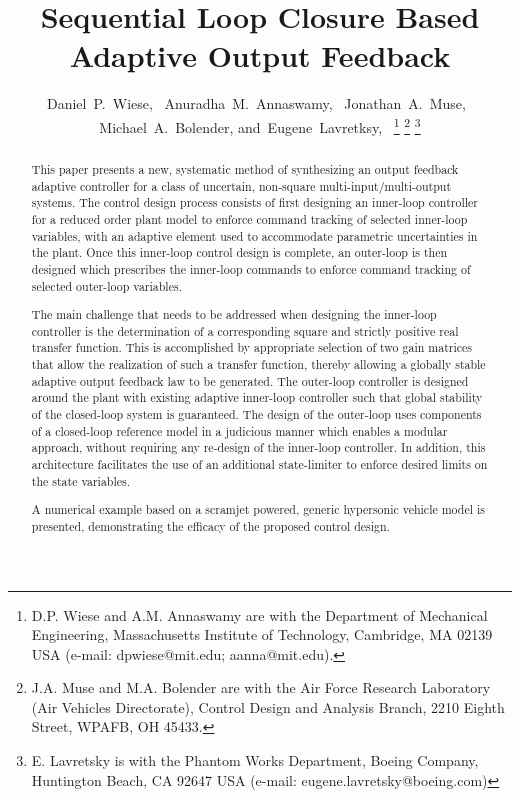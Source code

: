\documentclass[journal]{IEEEtran}
\theoremstyle{innercustomthm}
\begin{document}
  \title{Sequential Loop Closure Based Adaptive Output Feedback}

  \author{Daniel~P.~Wiese,~
          Anuradha~M.~Annaswamy,~
          Jonathan~A.~Muse,~
          Michael~A.~Bolender,
          and~Eugene~Lavretksy,~%
  \thanks{D.P. Wiese and A.M. Annaswamy are with the Department of Mechanical Engineering, Massachusetts Institute of Technology, Cambridge, MA 02139 USA (e-mail: dpwiese@mit.edu; aanna@mit.edu).}%
  \thanks{J.A. Muse and M.A. Bolender are with the Air Force Research Laboratory (Air Vehicles Directorate), Control Design and Analysis Branch, 2210 Eighth Street, WPAFB, OH 45433.}%
  \thanks{E. Lavretsky is with the Phantom Works Department, Boeing Company, Huntington Beach, CA 92647 USA (e-mail: eugene.lavretsky@boeing.com)}}

  \maketitle

  \begin{abstract}
    This paper presents a new, systematic method of synthesizing an output feedback adaptive controller for a class of uncertain, non-square multi-input/multi-output systems.
    The control design process consists of first designing an inner-loop controller for a reduced order plant model to enforce command tracking of selected inner-loop variables, with an adaptive element used to accommodate parametric uncertainties in the plant.
    Once this inner-loop control design is complete, an outer-loop is then designed which prescribes the inner-loop commands to enforce command tracking of selected outer-loop variables.

    The main challenge that needs to be addressed when designing the inner-loop controller is the determination of a corresponding square and strictly positive real transfer function.
    This is accomplished by appropriate selection of two gain matrices that allow the realization of such a transfer function, thereby allowing a globally stable adaptive output feedback law to be generated.
    The outer-loop controller is designed around the plant with existing adaptive inner-loop controller such that global stability of the closed-loop system is guaranteed.
    The design of the outer-loop uses components of a closed-loop reference model in a judicious manner which enables a modular approach, without requiring any re-design of the inner-loop controller.
    In addition, this architecture facilitates the use of an additional state-limiter to enforce desired limits on the state variables.

    A numerical example based on a scramjet powered, generic hypersonic vehicle model is presented, demonstrating the efficacy of the proposed control design.
  \end{abstract}
\end{document}
